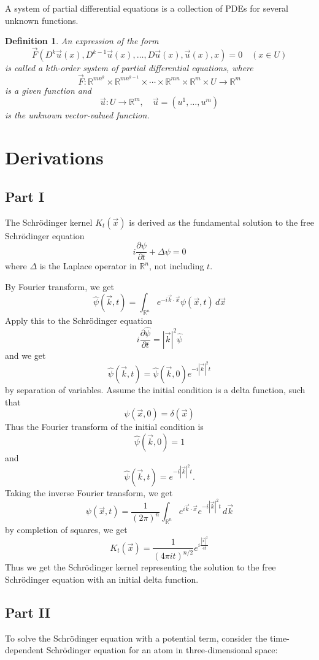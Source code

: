 \documentclass[a4paper,12pt]{report}
\newtheorem{definition}{Definition}[section]
\begin{document}
A system of partial differential equations is a collection of PDEs for several unknown functions. 
\begin{definition}
An expression of the form
\[
\vec{F}\left(D^k \vec{u}(x), D^{k-1} \vec{u}(x), \ldots, D \vec{u}(x), \vec{u}(x), x\right) = 0 \quad (x \in U)
\tag{7}\]
is called a \textit{\(k\)th-order system of partial differential equations}, where
\[
\vec{F} : \mathbb{R}^{mn^k} \times \mathbb{R}^{mn^{k-1}} \times \cdots \times \mathbb{R}^{mn} \times \mathbb{R}^m \times U \to \mathbb{R}^m
\]
is a given function and
\[
\vec{u} : U \to \mathbb{R}^m, \quad \vec{u} = (u^1, \ldots, u^m)
\]
is the unknown vector-valued function.
\end{definition}
\section{Derivations}
\subsection{Part I}

\hspace*{1.5em}The Schrödinger kernel \( K_t(\vec{x}) \) is derived as the fundamental solution to the free Schrödinger equation
\[
i \frac{\partial \psi}{\partial t} + \Delta \psi = 0
\]
where \( \Delta \) is the Laplace operator in \( \mathbb{R}^n \), not including \(t\). 

By Fourier transform, we get
\[
\hat{\psi}(\vec{k}, t) = \int_{\mathbb{R}^n} e^{-i \vec{k} \cdot \vec{x}} \psi(\vec{x}, t) \, d\vec{x}
\]
Apply this to the Schrödinger equation
\[
i \frac{\partial \hat{\psi}}{\partial t} = |\vec{k}|^2 \hat{\psi}
\]
and we get
\[
\hat{\psi}(\vec{k}, t) = \hat{\psi}(\vec{k}, 0) e^{-i |\vec{k}|^2 t}
\]
by separation of variables. Assume the initial condition is a delta function, such that
\[
\psi(\vec{x}, 0) = \delta(\vec{x})
\]
Thus the Fourier transform of the initial condition is 
\[
\hat{\psi}(\vec{k}, 0) = 1
\]
and 
\[
\hat{\psi}(\vec{k}, t) = e^{-i |\vec{k}|^2 t}. 
\] 
Taking the inverse Fourier transform, we get  
\[
\psi(\vec{x}, t) = \frac{1}{(2\pi)^n} \int_{\mathbb{R}^n} e^{i \vec{k} \cdot \vec{x}} e^{-i |\vec{k}|^2 t} \, d\vec{k}
\]
by completion of squares, we get
\[
K_t(\vec{x}) = \frac{1}{(4\pi it)^{n/2}} e^{i \frac{|\vec{x}|^2}{4t}}
\]
Thus we get the Schrödinger kernel representing the solution to the free Schrödinger equation with an initial delta function.
\subsection{Part II}
\hspace*{1.5em}To solve the Schrödinger equation with a potential term, consider the time-dependent Schrödinger equation for an atom in three-dimensional space:  
\end{document}
